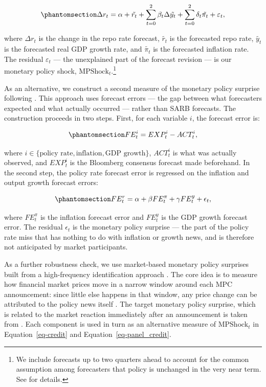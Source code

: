 \documentclass[
  letterpaper,
  DIV=11,
  numbers=noendperiod]{scrartcl}
\begin{document}
\begin{equation}\phantomsection\label{eq-mp-shock}{
\Delta r_t = \alpha + \tilde{r_t} + \sum_{t=0}^{2} \beta_t \Delta \tilde{y_t} + \sum_{t=0}^{2} \delta_t \tilde{\pi_t} + \varepsilon_t,
}\end{equation}

where \(\Delta r_t\) is the change in the repo rate forecast,
\(\tilde{r_t}\) is the forecasted repo rate, \(\tilde{y_t}\) is the
forecasted real GDP growth rate, and \(\tilde{\pi_t}\) is the forecasted
inflation rate. The residual \(\varepsilon_t\) --- the unexplained part
of the forecast revision --- is our monetary policy shock,
\(\text{MPShock}_{t}\).\footnote{We include forecasts up to two quarters
  ahead to account for the common assumption among forecasters that
  policy is unchanged in the very near term. See \citet{romer2004} for
  details.}

As an alternative, we construct a second measure of the monetary policy
surprise following \citet{miyajima2024}. This approach uses forecast
errors --- the gap between what forecasters expected and what actually
occurred --- rather than SARB forecasts. The construction proceeds in
two steps. First, for each variable \(i\), the forecast error is:

\begin{equation}\phantomsection\label{eq-forecast_error}{
FE^i_{t} =  EXP^i_{t} - ACT^i_{t},
}\end{equation}

where
\(i \in \{\text{policy rate}, \text{inflation}, \text{GDP growth}\}\),
\(ACT^i_{t}\) is what was actually observed, and \(EXP^i_{t}\) is the
Bloomberg consensus forecast made beforehand. In the second step, the
policy rate forecast error is regressed on the inflation and output
growth forecast errors:

\begin{equation}\phantomsection\label{eq-m_surprise}{
FE^{r}_{t} = \alpha + \beta FE^{\pi}_{t} + \gamma FE^{y}_t + \epsilon_t,
}\end{equation}

where \(FE^{\pi}_{t}\) is the inflation forecast error and \(FE^{y}_t\)
is the GDP growth forecast error. The residual \(\epsilon_t\) is the
monetary policy surprise --- the part of the policy rate miss that has
nothing to do with inflation or growth news, and is therefore not
anticipated by market participants.

As a further robustness check, we use market-based monetary policy
surprises built from a high-frequency identification approach
\citep{gurkaynak2005}. The core idea is to measure how financial market
prices move in a narrow window around each MPC announcement: since
little else happens in that window, any price change can be attributed
to the policy news itself \citep{nakamura2018}. The target monetary
policy surprise, which is related to the market reaction immediately
after an announcement is taken from \citet{pirozhkova2025}. Each
component is used in turn as an alternative measure of
\(\text{MPShock}_t\) in Equation~\ref{eq-credit} and
Equation~\ref{eq-panel_credit}.
\end{document}
